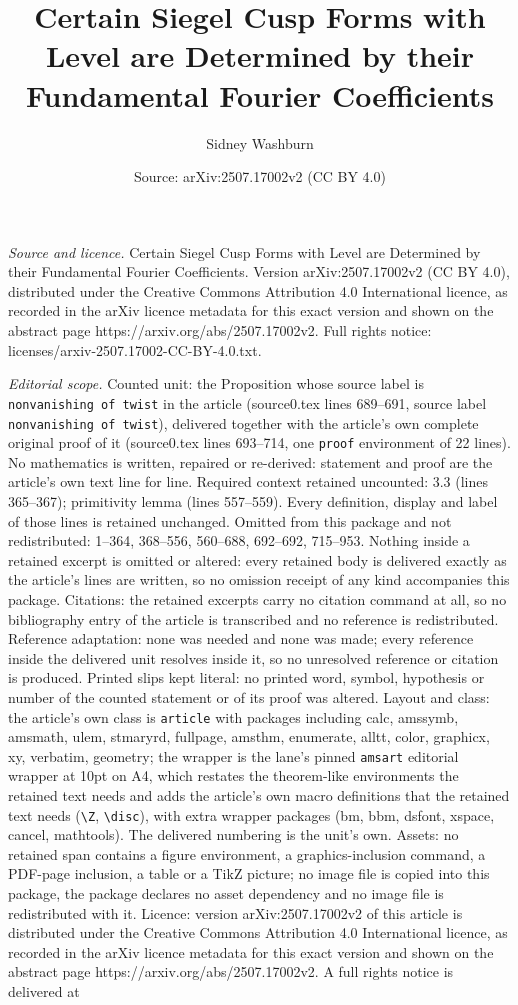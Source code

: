 \documentclass[10pt,a4paper]{amsart}
\title[Certain Siegel Cusp Forms with Level are Determined by their]{Certain Siegel Cusp Forms with Level are Determined by their Fundamental Fourier Coefficients}
\author{Sidney Washburn}
\date{Source: arXiv:2507.17002v2 (CC BY 4.0)}
\begin{document}
\maketitle

\noindent\emph{Source and licence.} Certain Siegel Cusp Forms with Level are Determined by their Fundamental Fourier Coefficients. Version arXiv:2507.17002v2 (CC BY 4.0), distributed under the Creative Commons Attribution 4.0 International licence, as recorded in the arXiv licence metadata for this exact version and shown on the abstract page https://arxiv.org/abs/2507.17002v2. Full rights notice: licenses/arxiv-2507.17002-CC-BY-4.0.txt.\par\smallskip

\noindent\textit{Editorial scope.} Counted unit: the Proposition whose source label is \texttt{nonvanishing of twist} in the article (source0.tex lines 689--691, source label \texttt{nonvanishing of twist}), delivered together with the article's own complete original proof of it (source0.tex lines 693--714, one \texttt{proof} environment of 22 lines). No mathematics is written, repaired or re-derived: statement and proof are the article's own text line for line. Required context retained uncounted: 3.3 (lines 365--367); primitivity lemma (lines 557--559). Every definition, display and label of those lines is retained unchanged. Omitted from this package and not redistributed: 1--364, 368--556, 560--688, 692--692, 715--953. Nothing inside a retained excerpt is omitted or altered: every retained body is delivered exactly as the article's lines are written, so no omission receipt of any kind accompanies this package. Citations: the retained excerpts carry no citation command at all, so no bibliography entry of the article is transcribed and no reference is redistributed. Reference adaptation: none was needed and none was made; every reference inside the delivered unit resolves inside it, so no unresolved reference or citation is produced. Printed slips kept literal: no printed word, symbol, hypothesis or number of the counted statement or of its proof was altered. Layout and class: the article's own class is \texttt{article} with packages including calc, amssymb, amsmath, ulem, stmaryrd, fullpage, amsthm, enumerate, alltt, color, graphicx, xy, verbatim, geometry; the wrapper is the lane's pinned \texttt{amsart} editorial wrapper at 10pt on A4, which restates the theorem-like environments the retained text needs and adds the article's own macro definitions that the retained text needs (\texttt{\textbackslash Z}, \texttt{\textbackslash disc}), with extra wrapper packages (bm, bbm, dsfont, xspace, cancel, mathtools). The delivered numbering is the unit's own. Assets: no retained span contains a figure environment, a graphics-inclusion command, a PDF-page inclusion, a table or a TikZ picture; no image file is copied into this package, the package declares no asset dependency and no image file is redistributed with it. Licence: version arXiv:2507.17002v2 of this article is distributed under the Creative Commons Attribution 4.0 International licence, as recorded in the arXiv licence metadata for this exact version and shown on the abstract page https://arxiv.org/abs/2507.17002v2. A full rights notice is delivered at 
\end{document}
